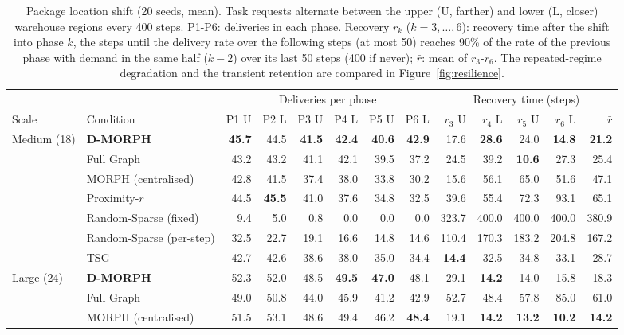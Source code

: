 \begin{table}[!ht]
\centering
\caption{Package location shift (20 seeds, mean). Task requests alternate between the upper (U, farther) and lower (L, closer) warehouse regions every 400 steps. P1-P6: deliveries in each phase. Recovery $r_k$ ($k=3,\ldots,6$): recovery time after the shift into phase $k$, the steps until the delivery rate over the following steps (at most 50) reaches 90\% of the rate of the previous phase with demand in the same half ($k-2$) over its last 50 steps (400 if never); $\bar r$: mean of $r_3$-$r_6$. The repeated-regime degradation and the transient retention are compared in Figure~\ref{fig:resilience}.}
\label{tab:resilience}
\footnotesize
\setlength{\tabcolsep}{4pt}
\begin{tabular}{llrrrrrrrrrrr}
\hline
 & & \multicolumn{6}{c}{Deliveries per phase} & \multicolumn{5}{c}{Recovery time (steps)} \\
Scale & Condition & P1 U & P2 L & P3 U & P4 L & P5 U & P6 L & $r_3$ U & $r_4$ L & $r_5$ U & $r_6$ L & $\bar r$ \\
\hline
Medium (18) & \textbf{D-MORPH} & \textbf{45.7} & 44.5 & \textbf{41.5} & \textbf{42.4} & \textbf{40.6} & \textbf{42.9} & 17.6 & \textbf{28.6} & 24.0 & \textbf{14.8} & \textbf{21.2} \\
 & Full Graph & 43.2 & 43.2 & 41.1 & 42.1 & 39.5 & 37.2 & 24.5 & 39.2 & \textbf{10.6} & 27.3 & 25.4 \\
 & MORPH (centralised) & 42.8 & 41.5 & 37.4 & 38.0 & 33.8 & 30.2 & 15.6 & 56.1 & 65.0 & 51.6 & 47.1 \\
 & Proximity-$r$ & 44.5 & \textbf{45.5} & 41.0 & 37.6 & 34.8 & 32.5 & 39.6 & 55.4 & 72.3 & 93.1 & 65.1 \\
 & Random-Sparse (fixed) & 9.4 & 5.0 & 0.8 & 0.0 & 0.0 & 0.0 & 323.7 & 400.0 & 400.0 & 400.0 & 380.9 \\
 & Random-Sparse (per-step) & 32.5 & 22.7 & 19.1 & 16.6 & 14.8 & 14.6 & 110.4 & 170.3 & 183.2 & 204.8 & 167.2 \\
 & TSG & 42.7 & 42.6 & 38.6 & 38.0 & 35.0 & 34.4 & \textbf{14.4} & 32.5 & 34.8 & 33.1 & 28.7 \\
\hline
Large (24) & \textbf{D-MORPH} & 52.3 & 52.0 & 48.5 & \textbf{49.5} & \textbf{47.0} & 48.1 & 29.1 & \textbf{14.2} & 14.0 & 15.8 & 18.3 \\
 & Full Graph & 49.0 & 50.8 & 44.0 & 45.9 & 41.2 & 42.9 & 52.7 & 48.4 & 57.8 & 85.0 & 61.0 \\
 & MORPH (centralised) & 51.5 & 53.1 & 48.6 & 49.4 & 46.2 & \textbf{48.4} & 19.1 & \textbf{14.2} & \textbf{13.2} & \textbf{10.2} & \textbf{14.2} \\

\end{tabular}
\end{table}
